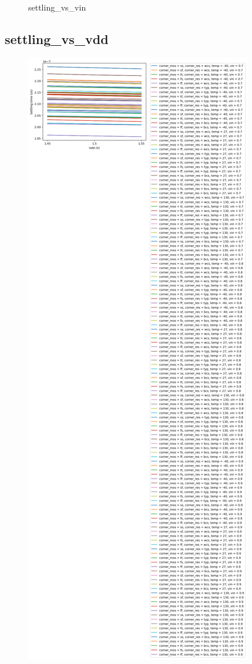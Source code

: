 \documentclass[
  a4paper,
  DIV=11,
  numbers=noendperiod]{scrartcl}
\begin{document}
\begin{tcolorbox}
\begin{figure}[H]
{}

\caption{settling\_vs\_vin}

\end{figure}%

\subsection*{settling\_vs\_vdd}\label{settling_vs_vdd-1}

\begin{figure}[H]

{\centering \includegraphics{./cace/_docs/ota-improved/schematic/settling_vs_vdd.png}

}
\end{figure}
\end{tcolorbox}
\end{document}
